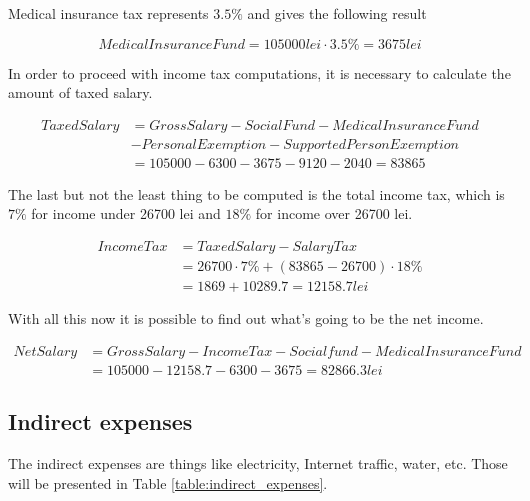 \documentclass[12pt,a4paper]{report}
\begin{document}
Medical insurance tax represents $3.5\%$ and gives the following result

\begin{equation}
 Medical Insurance Fund = 105000 lei \cdot 3.5\% = 3675 lei 
\end{equation}

In order to proceed with income tax computations, it is necessary to calculate the amount of taxed salary.

\begin{equation}
\begin{split}
 Taxed Salary &= Gross Salary - Social Fund - Medical Insurance Fund \\
	      & - Personal Exemption - Supported Person Exemption \\
              &= 105000 - 6300 - 3675 - 9120 - 2040 = 83865
\end{split}
\end{equation}

The last but not the least thing to be computed is the total income tax, which is $7\%$ for income under 26700 lei and $18\%$ for income over 26700 lei.

\begin{equation}
\begin{split}
 Income Tax &= Taxed Salary - Salary Tax \\
	    &= 26700 \cdot 7\% + (83865 - 26700) \cdot 18\% \\
	    & = 1869 + 10289.7 = 12158.7 lei
 \end{split}
\end{equation}

With all this now it is possible to find out what's going to be the net income.

\begin{equation}
\begin{split}
 Net Salary &= Gross Salary - Income Tax - Social fund - Medical Insurance Fund \\
            &= 105000 - 12158.7 - 6300 - 3675 = 82866.3 lei
\end{split}
\end{equation}

\subsection{Indirect expenses}
The indirect expenses are things like electricity, Internet traffic, water, etc. Those will be presented in Table \ref{table:indirect_expenses}.
\end{document}
